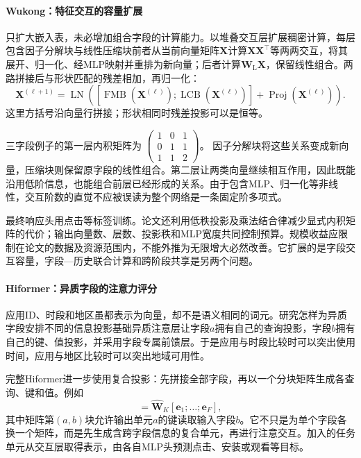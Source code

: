 \paragraph{Wukong：特征交互的容量扩展}
\label{sec:rs-wukong}

只扩大嵌入表，未必增加组合字段的计算能力。以堆叠交互层扩展稠密计算，每层包含因子分解块与线性压缩块前者从当前向量矩阵$\bm X$计算$\bm X\bm X^\top$等两两交互，将其展开、归一化、经MLP映射并重排为新向量；后者计算$\bm W_{\mathrm L}\bm X$，保留线性组合。两路拼接后与形状匹配的残差相加，再归一化：
\[
 \bm X^{(\ell+1)}=\operatorname{LN}\!\left(
 [\operatorname{FMB}(\bm X^{(\ell)});
  \operatorname{LCB}(\bm X^{(\ell)})]
  +\operatorname{Proj}(\bm X^{(\ell)})\right).
\]
这里方括号沿向量行拼接；形状相同时残差投影可以是恒等。

三字段例子的第一层内积矩阵为
$\left(\begin{smallmatrix}1&0&1\\0&1&1\\1&1&2\end{smallmatrix}\right)$。
因子分解块将这些关系变成新向量，压缩块则保留原字段的线性组合。第二层让两类向量继续相互作用，因此既能沿用低阶信息，也能组合前层已经形成的关系。由于包含MLP、归一化等非线性，交互阶数的直觉不应被误读为整个网络是一条固定阶多项式。

最终响应头用点击等标签训练。论文还利用低秩投影及乘法结合律减少显式内积矩阵的代价；输出向量数、层数、投影秩和MLP宽度共同控制预算。规模收益应限制在论文的数据及资源范围内，不能外推为无限增大必然改善。它扩展的是字段交互容量，字段—历史联合计算和跨阶段共享是另两个问题。

\paragraph{Hiformer：异质字段的注意力评分}
\label{sec:rs-hiformer}

应用ID、时段和地区虽都表示为向量，却不是语义相同的词元。研究怎样为异质字段安排不同的信息投影基础异质注意层让字段$a$拥有自己的查询投影，字段$b$拥有自己的键、值投影，并采用字段专属前馈层。于是应用与时段比较时可以突出使用时间，应用与地区比较时可以突出地域可用性。

完整Hiformer进一步使用复合投影：先拼接全部字段，再以一个分块矩阵生成各查询、键和值。例如
\begin{equation}
 [\bm k_1;\ldots;\bm k_F]=
 \widehat{\bm W}_{K}[\bm e_1;\ldots;\bm e_F],
 \label{eq:rs-hiformer}
\end{equation}
其中矩阵第$(a,b)$块允许输出单元$a$的键读取输入字段$b$。它不只是为单个字段各换一个矩阵，而是先生成含跨字段信息的复合单元，再进行注意交互。加入的任务单元从交互层取得表示，由各自MLP头预测点击、安装或观看等目标。

